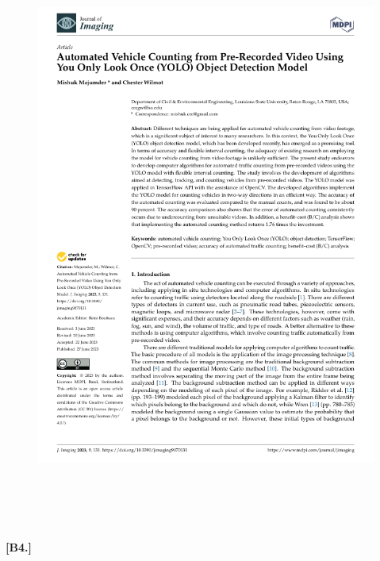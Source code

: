 \begin{figure}[h!]
    \centering
    \includegraphics[width=1\textwidth]{reference_papers/Paper_3.png}
\end{figure}
%
%
\\\\\\\\
\textbf{[B4.]}
%
%
%
